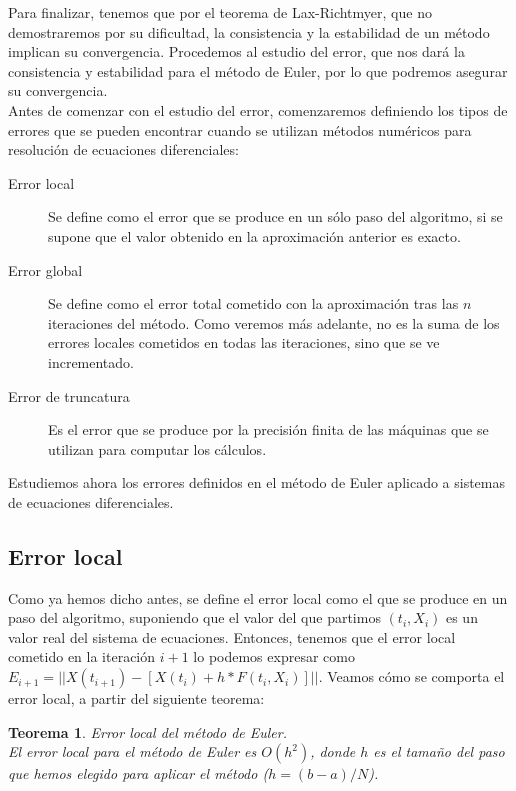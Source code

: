 \documentclass[12pt]{article}       %
\newtheorem{theorem}{Teorema}
\begin{document}
Para finalizar, tenemos que por el teorema de Lax-Richtmyer, que no demostraremos por su dificultad, la consistencia y la estabilidad de un método implican su convergencia. Procedemos al estudio del error, que nos dará la consistencia y estabilidad para el método de Euler, por lo que podremos asegurar su convergencia.\\

Antes de comenzar con el estudio del error, comenzaremos definiendo los tipos de errores que se pueden encontrar cuando se utilizan métodos numéricos para resolución de ecuaciones diferenciales:

\begin{description}
\item[Error local] Se define como el error que se produce en un sólo paso del algoritmo, si se supone que el valor obtenido en la aproximación anterior es exacto.
\item[Error global] Se define como el error total cometido con la aproximación tras las $n$ iteraciones del método. Como veremos más adelante, no es la suma de los errores locales cometidos en todas las iteraciones, sino que se ve incrementado.
\item[Error de truncatura] Es el error que se produce por la precisión finita de las máquinas que se utilizan para computar los cálculos.
\end{description}

Estudiemos ahora los errores definidos en el método de Euler aplicado a sistemas de ecuaciones diferenciales.

\subsection{Error local}

Como ya hemos dicho antes, se define el error local como el que se produce en un paso del algoritmo, suponiendo que el valor del que partimos $(t_i, X_i)$ es un valor real del sistema de ecuaciones. Entonces, tenemos que el error local cometido en la iteración $i+1$ lo podemos expresar como $E_{i+1} = ||X(t_{i+1}) - [X(t_{i}) + h*F(t_i, X_i)] ||$. Veamos cómo se comporta el error local, a partir del siguiente teorema:

\begin{theorem} Error local del método de Euler.\\

El error local para el método de Euler es $O(h^2)$, donde $h$ es el tamaño del paso que hemos elegido para aplicar el método ($h=(b-a)/N$).

\end{theorem}
\end{document}
